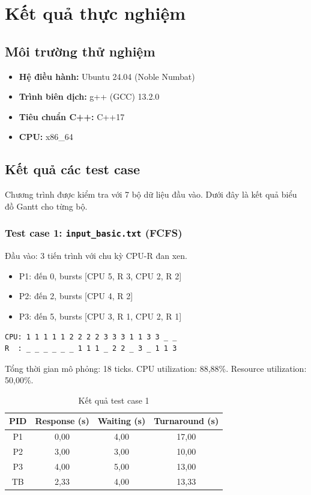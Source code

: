 \chapter{Kết quả thực nghiệm}

\section{Môi trường thử nghiệm}

\begin{itemize}
    \item \textbf{Hệ điều hành:} Ubuntu 24.04 (Noble Numbat)
    \item \textbf{Trình biên dịch:} g++ (GCC) 13.2.0
    \item \textbf{Tiêu chuẩn C++:} C++17
    \item \textbf{CPU:} x86\_64
\end{itemize}

\section{Kết quả các test case}

Chương trình được kiểm tra với 7 bộ dữ liệu đầu vào. Dưới đây là kết quả biểu đồ Gantt cho từng bộ.

\subsection{Test case 1: \texttt{input\_basic.txt} (FCFS)}

Đầu vào: 3 tiến trình với chu kỳ CPU-R đan xen.

\begin{itemize}
    \item P1: đến 0, bursts [CPU 5, R 3, CPU 2, R 2]
    \item P2: đến 2, bursts [CPU 4, R 2]
    \item P3: đến 5, bursts [CPU 3, R 1, CPU 2, R 1]
\end{itemize}

\begin{verbatim}
CPU: 1 1 1 1 1 2 2 2 2 3 3 3 1 1 3 3 _ _
R  : _ _ _ _ _ _ 1 1 1 _ 2 2 _ 3 _ 1 1 3
\end{verbatim}

Tổng thời gian mô phỏng: 18 ticks. CPU utilization: 88,88\%. Resource utilization: 50,00\%.

\begin{table}[h]
\centering
\begin{tabular}{|c|c|c|c|}
\hline
PID & Response (s) & Waiting (s) & Turnaround (s) \\
\hline
P1 & 0,00 & 4,00 & 17,00 \\
P2 & 3,00 & 3,00 & 10,00 \\
P3 & 4,00 & 5,00 & 13,00 \\
\hline
TB & 2,33 & 4,00 & 13,33 \\
\hline
\end{tabular}
\caption{Kết quả test case 1}
\end{table}

